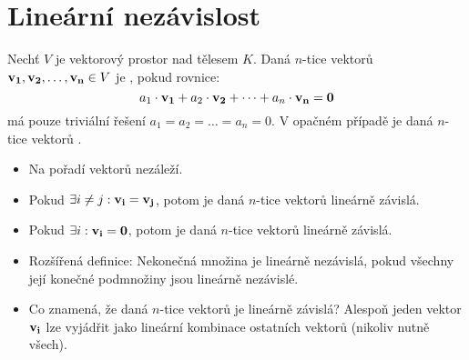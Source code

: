 \section{Lineární nezávislost}

\begin{definition}
    Nechť $V$ je vektorový prostor nad tělesem $K$. Daná $n$-tice vektorů
    $\mathbf{v_1}, \mathbf{v_2}, \dots, \mathbf{v_n} \in V$ je , 
    pokud rovnice:
    $$a_1\cdot\mathbf{v_1} + a_2\cdot\mathbf{v_2} + \dots + a_n\cdot\mathbf{v_n} = \mathbf{0}$$
    má pouze triviální řešení $a_1 = a_2 = \dots = a_n = 0$. V opačném 
    případě je daná $n$-tice vektorů .
\end{definition}

\begin{remark}
    \leavevmode
    \begin{itemize}
        \item Na pořadí vektorů nezáleží.
        \item Pokud $\exists i \neq j: \mathbf{v_i} = \mathbf{v_j}$, potom je daná $n$-tice
            vektorů lineárně závislá.
        \item Pokud $\exists i: \mathbf{v_i} = \mathbf{0}$, potom je daná $n$-tice vektorů 
            lineárně závislá.
        \item Rozšířená definice: Nekonečná množina je lineárně nezávislá,
            pokud všechny její konečné podmnožiny jsou lineárně nezávislé.
        \item Co znamená, že daná $n$-tice vektorů je lineárně závislá?
            Alespoň jeden vektor $\mathbf{v_i}$ lze vyjádřit jako lineární kombinace
            ostatních vektorů (nikoliv nutně všech).
    \end{itemize}
\end{remark}

